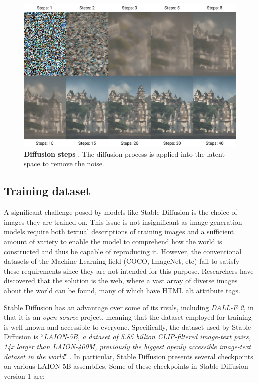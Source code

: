 \begin{figure}
    \centering
    \includegraphics[width=1\textwidth]{Pictures/DProcess.png} 
    \caption{\textbf{Diffusion steps} \cite{wikiStableDiffusion}. The diffusion process is applied into the latent space to remove the noise.}
    \label{fig:DProcess}
\end{figure}

\subsection{Training dataset}

A significant challenge posed by models like Stable Diffusion is the choice of images they are trained on. This issue is not insignificant as image generation models require both textual descriptions of training images and a sufficient amount of variety to enable the model to comprehend how the world is constructed and thus be capable of reproducing it. However, the conventional datasets of the Machine Learning field (COCO, ImageNet, etc) fail to satisfy these requirements since they are not intended for this purpose. Researchers have discovered that the solution is the web, where a vast array of diverse images about the world can be found, many of which have HTML alt attribute tags.

Stable Diffusion has an advantage over some of its rivals, including \textit{DALL-E 2}, in that it is an \textit{open-source} project, meaning that the dataset employed for training is well-known and accessible to everyone. Specifically, the dataset used by Stable Diffusion is ``\textit{LAION-5B, a dataset of 5.85 billion CLIP-filtered image-text pairs, 14x larger than LAION-400M, previously the biggest openly accessible image-text dataset in the world}" \cite{schuhmann2022laion}. In particular, Stable Diffusion presents several checkpoints on various LAION-5B assemblies. Some of these checkpoints in Stable Diffusion version 1 \cite{SDCardHF} are:

